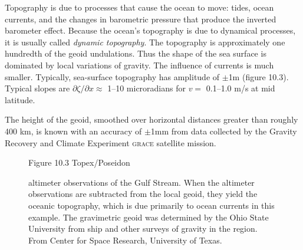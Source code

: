 Topography is due to processes that cause the ocean to move: tides,
ocean currents, and the changes in barometric pressure that produce
the inverted barometer effect. Because the ocean's topography is due
to dynamical processes, it is usually called \textit{dynamic
  topography}. The topography
is approximately one hundredth of the geoid
undulations. Thus the shape of the sea
surface is dominated by local variations of gravity. The influence of
currents is much smaller.  Typically, sea-surface topography has
amplitude of $\pm$1m (figure 10.3). Typical slopes are
$\partial\zeta/\partial x \approx $ 1--10 microradians for $v = $
0.1--1.0 m/s at mid latitude.

The height of the geoid, smoothed over horizontal
distances greater than roughly 400 km, is known with an
accuracy of $\pm$1mm from data collected by the
Gravity Recovery and Climate Experiment
\textsc{grace} satellite mission.

\begin{figure}[t!]
\footnotesize
Figure 10.3 Topex/Poseidon \rule{0mm}{3ex}altimeter observations of the Gulf
Stream. When the altimeter observations are
subtracted from the local geoid, they yield the oceanic
topography, which is due primarily to ocean currents in this
example. The gravimetric geoid was determined by the Ohio
State University from ship and other surveys of gravity in the
region. From Center for Space Research, University of Texas.
\label{sshprofile}
\vspace{-5ex}
\end{figure}

